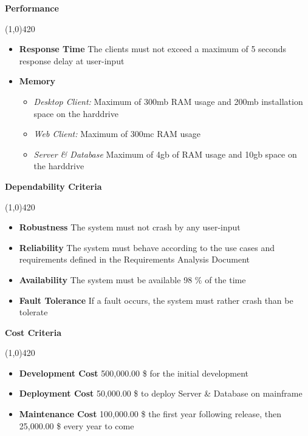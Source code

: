 \textbf{Performance}
\vspace{-1.1cm}
\begin{center}
\line(1,0){420}
\end{center}


\begin{itemize}
\item \textbf{Response Time} The clients must not exceed a maximum of 5 seconds response delay at user-input
\item \textbf{Memory} 
\begin{itemize}
\item \emph{Desktop Client:} Maximum of 300mb RAM usage and 200mb installation space on the harddrive
\item \emph{Web Client:} Maximum of 300mc RAM usage
\item \emph{Server \& Database} Maximum of 4gb of RAM usage and 10gb space on the harddrive
\end{itemize}
\end{itemize}

\vspace{0.5cm}

\textbf{Dependability Criteria}
\vspace{-1.1cm}
\begin{center}
\line(1,0){420}
\end{center}
\begin{itemize}
\item \textbf{Robustness} The system must not crash by any user-input
\item \textbf{Reliability} The system must behave according to the use cases and requirements defined in the Requirements Analysis Document
\item \textbf{Availability} The system must be available 98 \% of the time
\item \textbf{Fault Tolerance} If a fault occurs, the system must rather crash than be tolerate
\end{itemize}



\textbf{Cost Criteria}
\vspace{-1.1cm}
\begin{center}
\line(1,0){420}
\end{center}
\begin{itemize}
\item \textbf{Development Cost}  500,000.00 \$ for the initial development
\item \textbf{Deployment Cost}  50,000.00 \$ to deploy Server \& Database on mainframe
\item \textbf{Maintenance Cost}  100,000.00 \$ the first year following release, then 25,000.00 \$ every year to come
\end{itemize}

